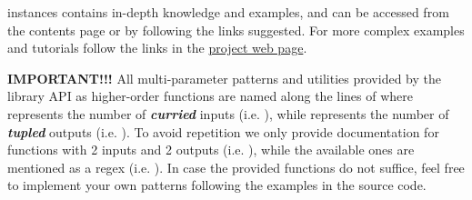  instances contains in-depth knowledge and examples, and can be
 accessed from the contents page or by following the links
 suggested. For more complex examples and tutorials follow the links
 in the \href{https://github.com/forsyde/forsyde-atom}{project web page}.\par
 \textbf{IMPORTANT!!!} All multi-parameter patterns and
 utilities provided by the library API as higher-order functions are
 named along the lines of  where  represents the
 number of \textbf{\emph{curried}} inputs (i.e. ),
 while  represents the number of \textbf{\emph{tupled}} outputs
 (i.e. ). To avoid repetition we only provide
 documentation for functions with 2 inputs and 2 outputs
 (i.e. ), while the available ones are mentioned as a
 regex (i.e. ). In case the provided functions
 do not suffice, feel free to implement your own patterns following
 the examples in the source code.\par

